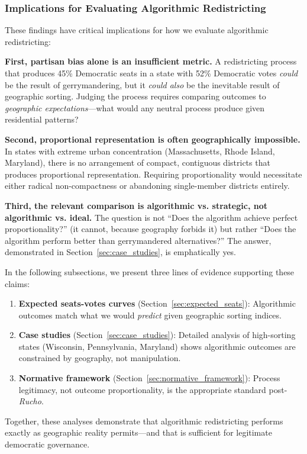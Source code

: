 \subsubsection{Implications for Evaluating Algorithmic Redistricting}

These findings have critical implications for how we evaluate algorithmic redistricting:

\textbf{First, partisan bias alone is an insufficient metric.} A redistricting process that produces 45\% Democratic seats in a state with 52\% Democratic votes \textit{could} be the result of gerrymandering, but it \textit{could also} be the inevitable result of geographic sorting. Judging the process requires comparing outcomes to \textit{geographic expectations}---what would any neutral process produce given residential patterns?

\textbf{Second, proportional representation is often geographically impossible.} In states with extreme urban concentration (Massachusetts, Rhode Island, Maryland), there is no arrangement of compact, contiguous districts that produces proportional representation. Requiring proportionality would necessitate either radical non-compactness or abandoning single-member districts entirely.

\textbf{Third, the relevant comparison is algorithmic vs. strategic, not algorithmic vs. ideal.} The question is not ``Does the algorithm achieve perfect proportionality?'' (it cannot, because geography forbids it) but rather ``Does the algorithm perform better than gerrymandered alternatives?'' The answer, demonstrated in Section~\ref{sec:case_studies}, is emphatically yes.

In the following subsections, we present three lines of evidence supporting these claims:
\begin{enumerate}
\item \textbf{Expected seats-votes curves} (Section~\ref{sec:expected_seats}): Algorithmic outcomes match what we would \textit{predict} given geographic sorting indices.
\item \textbf{Case studies} (Section~\ref{sec:case_studies}): Detailed analysis of high-sorting states (Wisconsin, Pennsylvania, Maryland) shows algorithmic outcomes are constrained by geography, not manipulation.
\item \textbf{Normative framework} (Section~\ref{sec:normative_framework}): Process legitimacy, not outcome proportionality, is the appropriate standard post-\textit{Rucho}.
\end{enumerate}

Together, these analyses demonstrate that algorithmic redistricting performs exactly as geographic reality permits---and that is sufficient for legitimate democratic governance.

